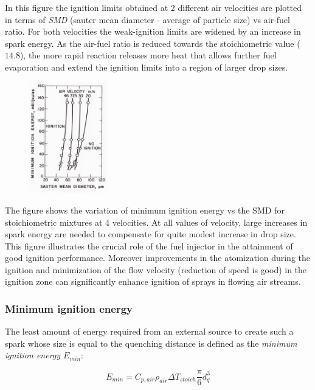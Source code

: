 \documentclass[12pt]{article}
\begin{document}
In this figure the ignition limits obtained at 2 different air velocities are plotted in terms of \textit{SMD} (sauter mean diameter - average of particle size) vs air-fuel ratio. For both velocities the weak-ignition limits are widened by an increase in spark energy. As the air-fuel ratio is reduced towards the stoichiometric value ($14.8$), the more rapid reaction releases more heat that allows further fuel evaporation and extend the ignition limits into a region of larger drop sizes.

\begin{figure}[!ht]
\centering
\includegraphics[width=0.3\textwidth]{figures/kerosene3.png}
\end{figure}

The figure shows the variation of minimum ignition energy vs the SMD for stoichiometric mixtures at 4 velocities. At all values of velocity, large increases in spark energy are needed to compensate for quite modest increase in drop size. This figure illustrates the crucial role of the fuel injector in the attainment of good ignition performance. Moreover improvements in the atomization during the ignition and minimization of the flow velocity (reduction of speed is good) in the ignition zone can significantly enhance ignition of sprays in flowing air streams.

\subsubsection{Minimum ignition energy}

The least amount of energy required from an external source to create such a spark whose size is equal to the quenching distance is defined as the \textit{minimum ignition energy $E_{min}$}:

\begin{equation}
    E_{min} = C_{p, air}\rho_{air}\Delta T_{stoich} \frac{\pi}{6}d_{q}^{3}
\end{equation}
\end{document}
